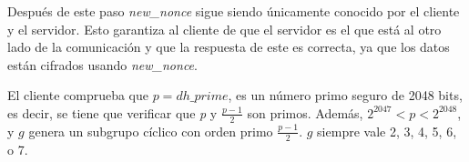 \begin{enumerate}
	Después de este paso \emph{new\_nonce} sigue siendo únicamente conocido por el cliente y el servidor. Esto garantiza  al cliente de que el servidor es el que está al otro lado de la comunicación y que la respuesta de este es correcta, ya que los datos están cifrados usando \emph{new\_nonce}.

	El cliente comprueba que $p=dh\_prime$, es un número primo seguro de 2048 bits, es decir, se tiene que verificar que \emph{p} y $\frac{p-1}{2}$ son primos. Además, $2^{2047}<p<2^{2048}$, y $g$ genera un subgrupo cíclico con orden primo $\frac{p-1}{2}$. $g$ siempre vale 2, 3, 4, 5, 6, o 7.



\end{enumerate}
